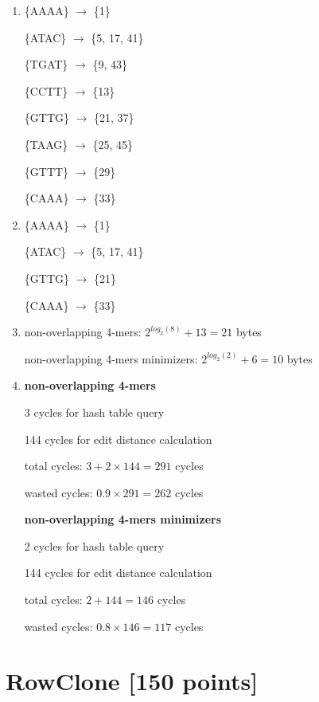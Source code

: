 \documentclass[a4paper]{article}
\begin{document}
\begin{enumerate}[label=\alph*)]
    \item \{AAAA\} $\rightarrow$ \{1\}

          \{ATAC\} $\rightarrow$ \{5, 17, 41\}

          \{TGAT\} $\rightarrow$ \{9, 43\}

          \{CCTT\} $\rightarrow$ \{13\}

          \{GTTG\} $\rightarrow$ \{21, 37\}

          \{TAAG\} $\rightarrow$ \{25, 45\}

          \{GTTT\} $\rightarrow$ \{29\}

          \{CAAA\} $\rightarrow$ \{33\}

    \item \{AAAA\} $\rightarrow$ \{1\}

          \{ATAC\} $\rightarrow$ \{5, 17, 41\}

          \{GTTG\} $\rightarrow$ \{21\}

          \{CAAA\} $\rightarrow$ \{33\}

      \item non-overlapping 4-mers: $2^{log_2(8)} + 13 = 21$ bytes

            non-overlapping 4-mers minimizers: $2^{log_2(2)} + 6 = 10$ bytes

      \item \textbf{non-overlapping 4-mers}

            3 cycles for hash table query

            144 cycles for edit distance calculation

            total cycles: $3 + 2 \times 144 = 291$ cycles

            wasted cycles: $0.9 \times 291 = 262$ cycles

            \textbf{non-overlapping 4-mers minimizers}

            2 cycles for hash table query

            144 cycles for edit distance calculation

            total cycles: $2 + 144 = 146$ cycles

            wasted cycles: $0.8 \times 146 = 117$ cycles
\end{enumerate}

\section{RowClone [150 points]}
\end{document}

